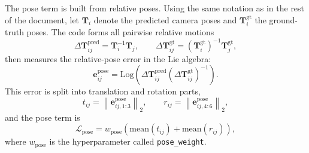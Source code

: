 \documentclass[11pt]{article}
\newcommand{\norm}[1]{\left\lVert #1 \right\rVert}
\begin{document}
The pose term is built from relative poses. Using the same notation as in the rest of the document, let \(\mathbf{T}_i\) denote the predicted camera poses and \(\mathbf{T}_i^{\mathrm{gt}}\) the ground-truth poses. The code forms all pairwise relative motions
\begin{equation}
\Delta \mathbf{T}_{ij}^{\mathrm{pred}} = \mathbf{T}_i^{-1}\mathbf{T}_j,
\qquad
\Delta \mathbf{T}_{ij}^{\mathrm{gt}} = (\mathbf{T}_i^{\mathrm{gt}})^{-1}\mathbf{T}_j^{\mathrm{gt}},
\end{equation}
then measures the relative-pose error in the Lie algebra:
\begin{equation}
\mathbf{e}_{ij}^{\mathrm{pose}} = \mathrm{Log}\!\left(\Delta \mathbf{T}_{ij}^{\mathrm{pred}}(\Delta \mathbf{T}_{ij}^{\mathrm{gt}})^{-1}\right).
\end{equation}
This error is split into translation and rotation parts,
\begin{equation}
t_{ij} = \norm{\mathbf{e}_{ij,1:3}^{\mathrm{pose}}}_2,
\qquad
r_{ij} = \norm{\mathbf{e}_{ij,4:6}^{\mathrm{pose}}}_2,
\end{equation}
and the pose term is
\begin{equation}
\mathcal{L}_{\mathrm{pose}} = w_{\mathrm{pose}}\left(\mathrm{mean}(t_{ij}) + \mathrm{mean}(r_{ij})\right),
\end{equation}
where \(w_{\mathrm{pose}}\) is the hyperparameter called \texttt{pose\_weight}.
\end{document}
